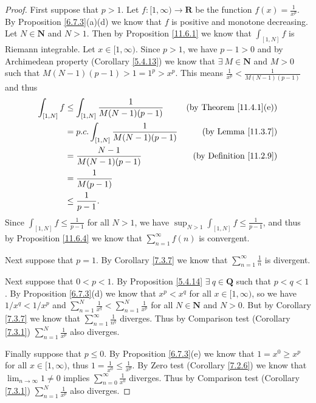 \begin{proof}
    First suppose that \(p > 1\).
    Let \(f : [1, \infty) \to \mathbf{R}\) be the function \(f(x) = \frac{1}{x^p}\).
    By Proposition \ref{6.7.3}(a)(d) we know that \(f\) is positive and monotone decreasing.
    Let \(N \in \mathbf{N}\) and \(N > 1\).
    Then by Proposition \ref{11.6.1} we know that \(\int_{[1, N]} f\) is Riemann integrable.
    Let \(x \in [1, \infty)\).
    Since \(p > 1\), we have \(p - 1 > 0\) and by Archimedean property (Corollary \ref{5.4.13}) we know that \(\exists\ M \in \mathbf{N}\) and \(M > 0\) such that \(M(N - 1)(p - 1) > 1 = 1^p > x^p\).
    This means \(\frac{1}{x^p} < \frac{1}{M(N - 1)(p - 1)}\) and thus
    \begin{align*}
        \int_{[1, N]} f & \leq \int_{[1, N]} \frac{1}{M(N - 1)(p - 1)}   & \text{(by Theorem \ref{11.4.1}(e))} \\
                        & = p.c. \int_{[1, N]} \frac{1}{M(N - 1)(p - 1)} & \text{(by Lemma \ref{11.3.7})}      \\
                        & = \frac{N - 1}{M(N - 1)(p - 1)}                & \text{(by Definition \ref{11.2.9})} \\
                        & = \frac{1}{M(p - 1)}                                                                 \\
                        & \leq \frac{1}{p - 1}.
    \end{align*}
    Since \(\int_{[1, N]} f \leq \frac{1}{p - 1}\) for all \(N > 1\), we have \(\sup_{N > 1} \int_{[1, N]} f \leq \frac{1}{p - 1}\), and thus by Proposition \ref{11.6.4} we know that \(\sum_{n = 1}^\infty f(n)\) is convergent.

    Next suppose that \(p = 1\).
    By Corollary \ref{7.3.7} we know that \(\sum_{n = 1}^\infty \frac{1}{n}\) is divergent.

    Next suppose that \(0 < p < 1\).
    By Proposition \ref{5.4.14} \(\exists\ q \in \mathbf{Q}\) such that \(p < q < 1\).
    By Proposition \ref{6.7.3}(d) we know that \(x^p < x^q\) for all \(x \in [1, \infty)\), so we have \(1 / x^q < 1 / x^p\) and \(\sum_{n = 1}^N \frac{1}{x^q} < \sum_{n = 1}^N \frac{1}{x^p}\) for all \(N \in \mathbf{N}\) and \(N > 0\).
    But by Corollary \ref{7.3.7} we know that \(\sum_{n = 1}^\infty \frac{1}{n^q}\) diverges.
    Thus by Comparison test (Corollary \ref{7.3.1}) \(\sum_{n = 1}^N \frac{1}{x^p}\) also diverges.

    Finally suppose that \(p \leq 0\).
    By Proposition \ref{6.7.3}(e) we know that \(1 = x^0 \geq x^p\) for all \(x \in [1, \infty)\), thus \(1 = \frac{1}{x^0} \leq \frac{1}{x^p}\).
    By Zero test (Corollary \ref{7.2.6}) we know that \(\lim_{n \to \infty} 1 \neq 0\) implies \(\sum_{n = 0}^\infty \frac{1}{x^0}\) diverges.
    Thus by Comparison test (Corollary \ref{7.3.1}) \(\sum_{n = 1}^N \frac{1}{x^p}\) also diverges.
\end{proof}

